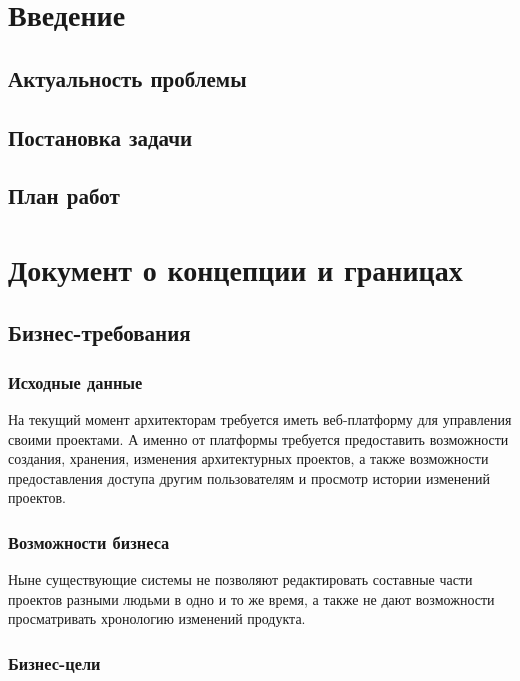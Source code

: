 \documentclass[a4paper,14pt]{extreport} %
\begin{document}
\tableofcontents %


\chapter{Введение}
\section{Актуальность проблемы}

\newpage
\section{Постановка задачи}

\newpage
\section{План работ}

\newpage

\chapter{Документ о концепции и границах}
\section{Бизнес-требования}
\subsection{Исходные данные}

На текущий момент архитекторам требуется иметь веб-платформу для управления своими проектами. А именно от платформы требуется предоставить возможности создания, хранения, изменения архитектурных проектов, а также возможности предоставления  доступа другим пользователям и просмотр истории изменений проектов.


\subsection{Возможности бизнеса}

Ныне существующие системы не позволяют редактировать составные части проектов разными людьми в одно и то же время, а также не дают возможности просматривать хронологию изменений продукта.

\newpage

\subsection{Бизнес-цели}
\end{document}
